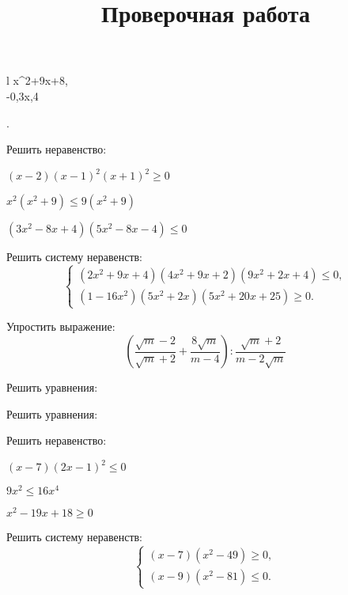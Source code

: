 \begin{listofex}
\begin{enumcols}[itemcolumns=2]
\begin{array}{l}
			x^2+9x+8,\\
			-0,3x,4
		\end{array}
		\right. \) 
	\end{enumcols}
	\item Решить неравенство:
	\begin{enumcols}[itemcolumns=1]
		\item \( (x-2)(x-1)^2(x+1)^2\ge0 \) \answer{ \( \{-1\}\cup\{1\}\cup[2;+\infty) \) }
		\item \( x^2(x^2+9)\le9(x^2+9) \) \answer{ \( [-3;3] \) }
		\item {}
		\item \( (3x^2-8x+4)(5x^2-8x-4)\le0 \)
	\end{enumcols}
	\item Решить систему неравенств:
	\[ \left\{
	\begin{array}{l}
		(2x^2+9x+4)(4x^2+9x+2)(9x^2+2x+4)\le0,\\
		(1-16x^2)(5x^2+2x)(5x^2+20x+25)\ge0.
	\end{array}
	\right. \]
\end{listofex}
\newpage
\title{Проверочная работа}
\begin{listofex}
	\item {}
	\item Упростить выражение:
	\[  \left( \dfrac{\sqrt{m}-2}{\sqrt{m}+2}+\dfrac{8\sqrt{m}}{m-4} \right):\dfrac{\sqrt{m}+2}{m-2\sqrt{m}} \]
	\item Решить уравнения:
	\begin{enumcols}[itemcolumns=2]
		\item {}
		\item {}
		\item {}
		\item {}
	\end{enumcols}
	\item Решить уравнения:
	\begin{enumcols}[itemcolumns=2]
		\item {}
		\item {}
	\end{enumcols}
	\item Решить неравенство:
	\begin{enumcols}[itemcolumns=3]
		\item \( (x-7)(2x-1)^2\le0 \)
		\item \( 9x^2\le16x^4 \)
		\item \( x^2-19x+18\ge0 \)
	\end{enumcols}
	\item Решить систему неравенств:
	\[ \left\{
	\begin{array}{l}
		(x-7)(x^2-49)\ge0,\\
		(x-9)(x^2-81)\le0.
	\end{array}
	\right. \]
	\item {}
\end{listofex}
